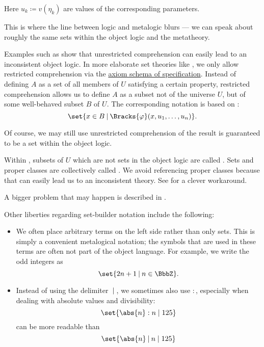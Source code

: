 \begin{definition}
  Here \( u_k \coloneqq v(\eta_k) \) are values of the corresponding parameters.

  This is where the line between logic and metalogic blurs --- we can speak about roughly the same sets within the object logic and the metatheory.

  Examples such as  show that unrestricted comprehension can easily lead to an inconsistent object logic. In more elaborate set theories like \hyperref[def:zfc]{}, we only allow restricted comprehension via the \hyperref[def:zfc/specification]{axiom schema of specification}. Instead of defining \( A \) as a set of all members of \( U \) satisfying a certain property, restricted comprehension allows us to define \( A \) as a subset not of the universe \( U \), but of some well-behaved subset \( B \) of \( U \). The corresponding notation is based on :
  \begin{equation*}
    \set{ x \in B \given \Bracks{\varphi}(x, u_1, \ldots, u_n) }.
  \end{equation*}

  Of course, we may still use unrestricted comprehension of the result is guaranteed to be a set within the object logic.

  Within , subsets of \( U \) which are not sets in the object logic are called . Sets and proper classes are collectively called . We avoid referencing proper classes because that can easily lead us to an inconsistent theory. See  for a clever workaround.

  A bigger problem that may happen is described in .

  Other liberties regarding set-builder notation include the following:
  \begin{itemize}
    \item We often place arbitrary terms on the left side rather than only sets. This is simply a convenient metalogical notation; the symbols that are used in these terms are often not part of the object language. For example, we write the odd integers as
    \begin{equation*}
      \set{ 2n + 1 \given n \in \BbbZ }.
    \end{equation*}

    \item Instead of using the delimiter \( \given \), we sometimes also use \( : \), especially when dealing with absolute values and divisibility:
    \begin{equation*}
      \set{ \abs{n} : n \mid 125 }
    \end{equation*}
    can be more readable than
    \begin{equation*}
      \set{ \abs{n} \given n \mid 125 }
    \end{equation*}


\end{itemize}
\end{definition}

